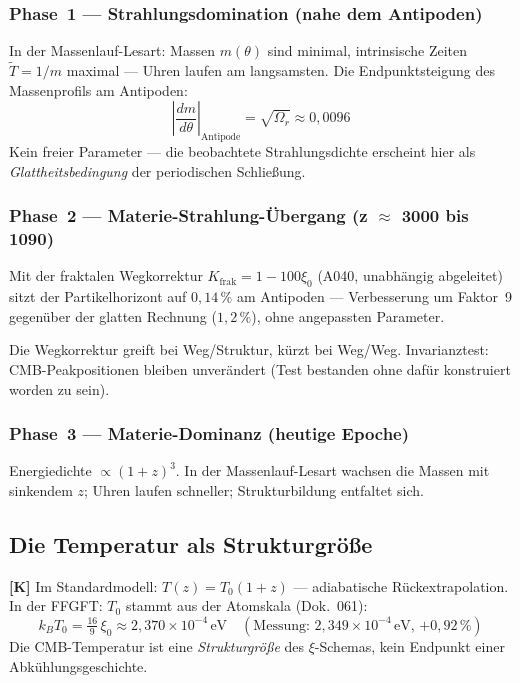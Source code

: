 \subsubsection{Phase~1 --- Strahlungsdomination (nahe dem Antipoden)}

In der Massenlauf-Lesart: Massen $m(\theta)$ sind minimal,
intrinsische Zeiten $\tilde{T} = 1/m$ maximal --- Uhren laufen am
langsamsten. Die Endpunktsteigung des Massenprofils am Antipoden:
\[
  \left|\frac{dm}{d\theta}\right|_\text{Antipode}
  = \sqrt{\Omega_r} \approx 0{,}0096
\]
Kein freier Parameter --- die beobachtete Strahlungsdichte erscheint
hier als \emph{Glattheitsbedingung} der periodischen Schließung.

\subsubsection{Phase~2 --- Materie-Strahlung-Übergang (z $\approx$ 3000 bis 1090)}

Mit der fraktalen Wegkorrektur $K_\text{frak} = 1-100\xi_0$ (A040,
unabhängig abgeleitet) sitzt der Partikelhorizont auf $0{,}14\,\%$
am Antipoden --- Verbesserung um Faktor~9 gegenüber der glatten
Rechnung ($1{,}2\,\%$), ohne angepassten Parameter.

Die Wegkorrektur greift bei Weg/Struktur, kürzt bei Weg/Weg.
Invarianztest: CMB-Peakpositionen bleiben unverändert
(Test bestanden ohne dafür konstruiert worden zu sein).

\subsubsection{Phase~3 --- Materie-Dominanz (heutige Epoche)}

Energiedichte $\propto (1+z)^3$. In der Massenlauf-Lesart wachsen
die Massen mit sinkendem $z$; Uhren laufen schneller; Strukturbildung
entfaltet sich.

\subsection{Die Temperatur als Strukturgröße}

\textbf{[K]} Im Standardmodell: $T(z) = T_0(1+z)$ --- adiabatische
Rückextrapolation. In der FFGFT: $T_0$ stammt aus der Atomskala
(Dok.~061):
\[
  k_B T_0 = \tfrac{16}{9}\,\xi_0 \approx 2{,}370\times10^{-4}\,\text{eV}
  \quad(\text{Messung: }2{,}349\times10^{-4}\,\text{eV, }{+0{,}92\,\%})
\]
Die CMB-Temperatur ist eine \emph{Strukturgröße} des $\xi$-Schemas,
kein Endpunkt einer Abkühlungsgeschichte.

